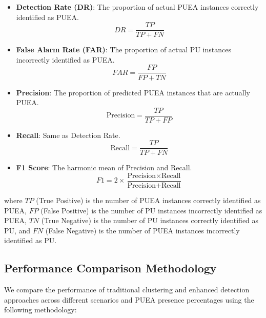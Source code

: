 \documentclass[conference]{IEEEtran}
\begin{document}
\begin{itemize}
    \item \textbf{Detection Rate (DR)}: The proportion of actual PUEA instances correctly identified as PUEA.
    \begin{equation}
    DR = \frac{TP}{TP + FN}
    \end{equation}
    
    \item \textbf{False Alarm Rate (FAR)}: The proportion of actual PU instances incorrectly identified as PUEA.
    \begin{equation}
    FAR = \frac{FP}{FP + TN}
    \end{equation}
    
    \item \textbf{Precision}: The proportion of predicted PUEA instances that are actually PUEA.
    \begin{equation}
    \text{Precision} = \frac{TP}{TP + FP}
    \end{equation}
    
    \item \textbf{Recall}: Same as Detection Rate.
    \begin{equation}
    \text{Recall} = \frac{TP}{TP + FN}
    \end{equation}
    
    \item \textbf{F1 Score}: The harmonic mean of Precision and Recall.
    \begin{equation}
    F1 = 2 \times \frac{\text{Precision} \times \text{Recall}}{\text{Precision} + \text{Recall}}
    \end{equation}
\end{itemize}

where $TP$ (True Positive) is the number of PUEA instances correctly identified as PUEA, $FP$ (False Positive) is the number of PU instances incorrectly identified as PUEA, $TN$ (True Negative) is the number of PU instances correctly identified as PU, and $FN$ (False Negative) is the number of PUEA instances incorrectly identified as PU.

\subsection{Performance Comparison Methodology}

We compare the performance of traditional clustering and enhanced detection approaches across different scenarios and PUEA presence percentages using the following methodology:
\end{document}
